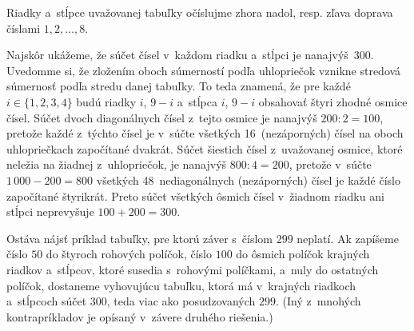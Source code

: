 {%
Riadky a~stĺpce uvažovanej tabuľky očíslujme zhora nadol, resp. zľava doprava
číslami $1, 2, \dots, 8$.

Najskôr ukážeme, že súčet čísel v~každom riadku a~stĺpci je nanajvýš~$300$.
Uvedomme si, že zložením oboch súmerností podľa uhlopriečok vznikne
stredová súmernosť podľa stredu danej tabuľky. To teda znamená, že
pre každé $i \in\{ 1, 2, 3, 4\}$ budú
riadky $i$, $9-i$ a~stĺpca $i$, $9-i$ obsahovať štyri
zhodné osmice čísel. Súčet dvoch diagonálnych čísel
z~tejto osmice je nanajvýš $200:2 = 100$, pretože
každé z~týchto čísel je v~súčte všetkých 16~(nezáporných) čísel
na oboch uhlopriečkach započítané dvakrát. Súčet šiestich
čísel z~uvažovanej osmice, ktoré neležia na žiadnej z~uhlopriečok, je nanajvýš $800:4 = 200$,
pretože v~súčte $1\,000-200 = 800$ všetkých 48~nediagonálnych
(nezáporných) čísel je každé číslo započítané štyrikrát. Preto
súčet všetkých ôsmich čísel v~žiadnom riadku ani stĺpci neprevyšuje
$100 +200 = 300$.

Ostáva nájsť príklad tabuľky, pre ktorú záver s~číslom $299$
neplatí. Ak zapíšeme číslo $50$ do štyroch rohových políčok, číslo $100$
do ôsmich políčok krajných riadkov a~stĺpcov, ktoré susedia s~rohovými
políčkami, a~nuly do ostatných políčok, dostaneme vyhovujúcu tabuľku,
ktorá má v~krajných riadkoch a~stĺpcoch súčet $300$, teda viac ako posudzovaných $299$.
(Iný z~mnohých kontrapríkladov je opísaný v~závere druhého riešenia.)


}
